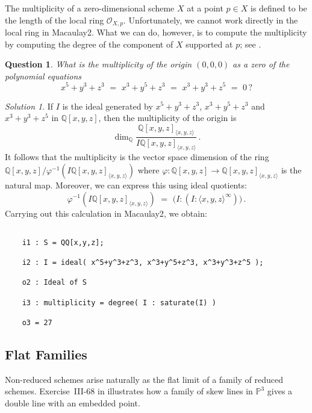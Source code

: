 \documentclass[12pt,noamsfonts]{amsart}
\def\QQ{{\mathbb Q}}
\def\PP{{\mathbb P}}
\newtheorem{question}{Question}
\theoremstyle{definition}
\theoremstyle{remark}
\newtheorem*{solution}{Solution}
\begin{document}
The multiplicity of a zero-dimensional scheme $X$ at a point $p \in X$
is defined to be the length of the local ring $\mathcal{O}_{X,p}$.
Unfortunately, we cannot work directly in the local ring in {\sc
Macaulay2}. What we can do, however, is to compute the
multiplicity by computing the
degree of the component of $X$ supported at $p$; see \cite[page 66]{EH}.

\begin{question}
What is the multiplicity of the origin $(0,0,0)$ as a zero of the
polynomial equations
\[
x^{5}+y^{3}+z^{3} \,\, = \,\, x^{3}+y^{5}+z^{3} \,\, = 
\,\, x^{3}+y^{3}+z^{5} \,\, = \, \, 0 \, ?
\]
\end{question}

\begin{solution}
If $I$ is the ideal generated by $x^{5}+y^{3}+z^{3}$,
$x^{3}+y^{5}+z^{3}$ and $x^{3}+y^{3}+z^{5}$ in $\QQ[x,y,z]$, then the
multiplicity of the origin is
\[
\dim_{\QQ} \frac{\QQ[x,y,z]_{\langle x,y,z \rangle}}
{I \QQ[x,y,z]_{\langle x,y,z \rangle}} \, .
\]
It follows that the multiplicity is the vector space dimension of the
ring $\QQ[x,y,z] / \varphi^{-1}(I \QQ[x,y,z]_{\langle x,y,z \rangle})$
where $\varphi \colon \QQ[x,y,z] \to \QQ[x,y,z]_{\langle x,y,z \rangle}$
is the natural map.  Moreover, we can express this using ideal
quotients:
\[
\varphi^{-1}(I \QQ[x,y,z]_{\langle x,y,z \rangle}) \,\,= \,\, \big(I : (I :
\langle x,y,z \rangle^{\infty})\big) \, .
\]
Carrying out this calculation in {\sc Macaulay2}, we obtain:
{\scriptsize
\begin{verbatim}

    i1 : S = QQ[x,y,z];
    
    i2 : I = ideal( x^5+y^3+z^3, x^3+y^5+z^3, x^3+y^3+z^5 );

    o2 : Ideal of S
    
    i3 : multiplicity = degree( I : saturate(I) )
    
    o3 = 27

\end{verbatim}}
\end{solution}

\subsection*{Flat Families}

Non-reduced schemes arise naturally as the flat limit of a family of
reduced schemes. Exercise~III-68 in 
\cite{EH} illustrates how a family of skew lines in $\PP^{3}$
gives a double line with an embedded point.
\end{document}
